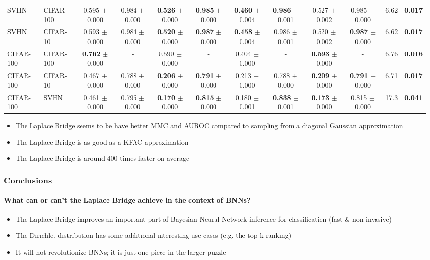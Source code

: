 \documentclass[10pt,usepdftitle=false,aspectratio=169,handout]{beamer}
\begin{document}
\begin{frame}
{\begin{tabular}{l  l || c c c c | c  c  c  c | c c}
			SVHN & CIFAR-100  & 0.595 $\pm$ 0.000 & 0.984 $\pm$ 0.000 &  \textbf{0.526} $\pm$ 0.000 & \textbf{0.985} $\pm$ 0.000& \textbf{0.460} $\pm$ 0.004  & \textbf{0.986} $\pm$ 0.001 & 0.527 $\pm$ 0.002 & 0.985 $\pm$ 0.000 & 6.62 & \textbf{0.017}\\
			SVHN & CIFAR-10   & 0.593 $\pm$ 0.000 & 0.984 $\pm$ 0.000&  \textbf{0.520} $\pm$ 0.000 & \textbf{0.987} $\pm$ 0.000 & \textbf{0.458} $\pm$ 0.004  & 0.986 $\pm$ 0.001 & 0.520 $\pm$ 0.002 & \textbf{0.987} $\pm$ 0.000 & 6.62 & \textbf{0.017}\\
			\midrule
			CIFAR-100 & CIFAR-100 & \textbf{0.762} $\pm$ 0.000& - & 0.590 $\pm$ 0.000& - &  0.404 $\pm$ 0.000& - & \textbf{0.593} $\pm$ 0.000& - & 6.76 & \textbf{0.016}\\
			CIFAR-100 & CIFAR-10  & 0.467 $\pm$ 0.000& 0.788 $\pm$ 0.000& \textbf{0.206} $\pm$ 0.000& \textbf{0.791} $\pm$ 0.000& 0.213 $\pm$ 0.000& 0.788 $\pm$ 0.000& \textbf{0.209} $\pm$ 0.000& \textbf{0.791} $\pm$ 0.000 & 6.71 & \textbf{0.017}\\
			CIFAR-100 & SVHN      & 0.461 $\pm$ 0.000& 0.795 $\pm$ 0.000& \textbf{0.170} $\pm$ 0.000& \textbf{0.815} $\pm$ 0.000& 0.180 $\pm$ 0.001 & \textbf{0.838} $\pm$ 0.001 & \textbf{0.173} $\pm$ 0.000 & 0.815 $\pm$ 0.000 & 17.3 & \textbf{0.041}\\
			\bottomrule
		\end{tabular}
	}
	\begin{itemize}
		\item The Laplace Bridge seems to be have better MMC and AUROC compared to sampling from a diagonal Gaussian approximation
		\item The Laplace Bridge is as good as a KFAC approximation
		\item The Laplace Bridge is around 400 times faster on average
	\end{itemize}
\end{frame}


\begin{frame}\frametitle{Conclusions}
	\framesubtitle{What can or can't the Laplace Bridge achieve in the context of BNNs?}
	\begin{itemize}
		\item The Laplace Bridge improves an important part of Bayesian Neural Network inference for classification (fast \& non-invasive)
		\item The Dirichlet distribution has some additional interesting use cases (e.g. the top-k ranking)
		\item It will not revolutionize BNNs; it is just one piece in the larger puzzle
	\end{itemize}
\end{frame}
\end{document}
